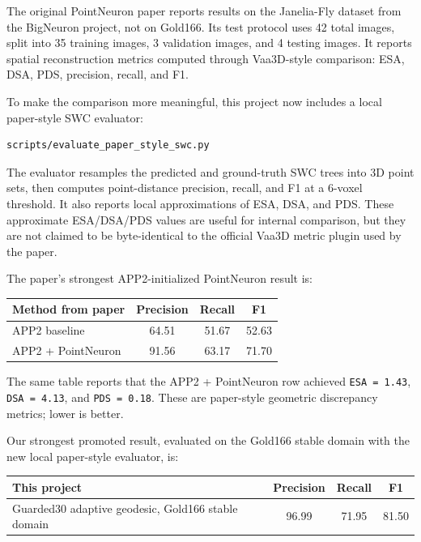 \documentclass[11pt]{article}
\begin{document}
The original PointNeuron paper reports results on the Janelia-Fly dataset from
the BigNeuron project, not on Gold166. Its test protocol uses 42 total images,
split into 35 training images, 3 validation images, and 4 testing images. It
reports spatial reconstruction metrics computed through Vaa3D-style comparison:
ESA, DSA, PDS, precision, recall, and F1.

To make the comparison more meaningful, this project now includes a local
paper-style SWC evaluator:

\begin{lstlisting}
scripts/evaluate_paper_style_swc.py
\end{lstlisting}

The evaluator resamples the predicted and ground-truth SWC trees into 3D point
sets, then computes point-distance precision, recall, and F1 at a 6-voxel
threshold. It also reports local approximations of ESA, DSA, and PDS. These
approximate ESA/DSA/PDS values are useful for internal comparison, but they are
not claimed to be byte-identical to the official Vaa3D metric plugin used by
the paper.

The paper's strongest APP2-initialized PointNeuron result is:

\begin{center}
\begin{tabular}{lccc}
\toprule
Method from paper & Precision & Recall & F1 \\
\midrule
APP2 baseline & 64.51 & 51.67 & 52.63 \\
APP2 + PointNeuron & 91.56 & 63.17 & 71.70 \\
\bottomrule
\end{tabular}
\end{center}

The same table reports that the APP2 + PointNeuron row achieved
\texttt{ESA = 1.43}, \texttt{DSA = 4.13}, and \texttt{PDS = 0.18}. These are
paper-style geometric discrepancy metrics; lower is better.

Our strongest promoted result, evaluated on the Gold166 stable domain with the
new local paper-style evaluator, is:

\begin{center}
\begin{tabular}{lccc}
\toprule
This project & Precision & Recall & F1 \\
\midrule
Guarded30 adaptive geodesic, Gold166 stable domain & 96.99 & 71.95 & 81.50 \\
\bottomrule
\end{tabular}
\end{center}
\end{document}
